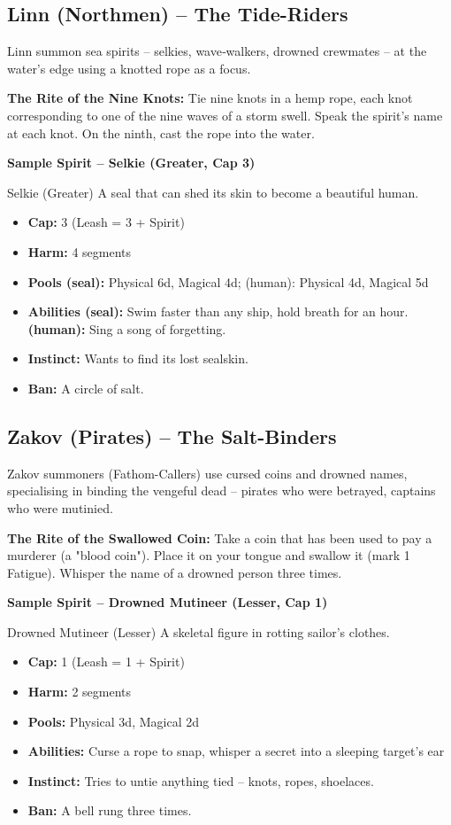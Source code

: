 \documentclass[10pt,a5paper]{book}
\begin{document}
\subsection{Linn (Northmen) -- The Tide-Riders}
Linn summon sea spirits -- selkies, wave‑walkers, drowned crewmates -- at the water's edge using a knotted rope as a focus.

\textbf{The Rite of the Nine Knots:} Tie nine knots in a hemp rope, each knot corresponding to one of the nine waves of a storm swell. Speak the spirit's name at each knot. On the ninth, cast the rope into the water.

\textbf{Sample Spirit -- Selkie (Greater, Cap 3)}
\begin{spiritcard}{Selkie (Greater)}
A seal that can shed its skin to become a beautiful human.
\begin{itemize}
    \item \textbf{Cap:} 3 (Leash = 3 + Spirit)
    \item \textbf{Harm:} 4 segments
    \item \textbf{Pools (seal):} Physical 6d, Magical 4d; (human): Physical 4d, Magical 5d
    \item \textbf{Abilities (seal):} Swim faster than any ship, hold breath for an hour. \textbf{(human):} Sing a song of forgetting.
    \item \textbf{Instinct:} Wants to find its lost sealskin.
    \item \textbf{Ban:} A circle of salt.
\end{itemize}
\end{spiritcard}

\subsection{Zakov (Pirates) -- The Salt-Binders}
Zakov summoners (Fathom-Callers) use cursed coins and drowned names, specialising in binding the vengeful dead -- pirates who were betrayed, captains who were mutinied.

\textbf{The Rite of the Swallowed Coin:} Take a coin that has been used to pay a murderer (a "blood coin"). Place it on your tongue and swallow it (mark 1 Fatigue). Whisper the name of a drowned person three times.

\textbf{Sample Spirit -- Drowned Mutineer (Lesser, Cap 1)}
\begin{spiritcard}{Drowned Mutineer (Lesser)}
A skeletal figure in rotting sailor's clothes.
\begin{itemize}
    \item \textbf{Cap:} 1 (Leash = 1 + Spirit)
    \item \textbf{Harm:} 2 segments
    \item \textbf{Pools:} Physical 3d, Magical 2d
    \item \textbf{Abilities:} Curse a rope to snap, whisper a secret into a sleeping target's ear
    \item \textbf{Instinct:} Tries to untie anything tied -- knots, ropes, shoelaces.
    \item \textbf{Ban:} A bell rung three times.
\end{itemize}
\end{spiritcard}
\end{document}
